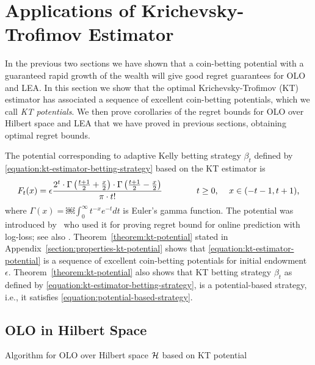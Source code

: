 \section{Applications of Krichevsky-Trofimov Estimator}
\label{section:kt-estimator}

In the previous two sections we have shown that a coin-betting potential with a
guaranteed rapid growth of the wealth will give good regret guarantees for
\ac{OLO} and \ac{LEA}. In this section we show that the optimal
Krichevsky-Trofimov (KT) estimator has associated a sequence of excellent
coin-betting potentials, which we call \emph{KT potentials}. We then prove
corollaries of the regret bounds for \ac{OLO} over Hilbert space and \ac{LEA}
that we have proved in previous sections, obtaining optimal regret bounds.

The potential corresponding to adaptive Kelly betting strategy
$\beta_t$ defined by \eqref{equation:kt-estimator-betting-strategy}
based on the KT estimator is
\begin{equation}
\label{equation:kt-estimator-potential}
F_t(x) = \epsilon \frac{2^t \cdot \Gamma \left( \frac{t+1}{2} + \frac{x}{2} \right) \cdot \Gamma \left( \frac{t+1}{2} - \frac{x}{2} \right)}{\pi \cdot t!}
\qquad \qquad \text{$t \ge 0$, \quad $x \in \left(-t-1, t+1\right)$,}
\end{equation}
where $\Gamma(x) = ￼\int_0^\infty t^{-x} e^{-t} dt$ is Euler's gamma function.
The potential was introduced by~\citet{KrichevskyT81} who used it for proving
regret bound for online prediction with log-loss; see also \cite[Section
9.7]{Cesa-BianchiL06}.
Theorem~\ref{theorem:kt-potential} stated in
Appendix~\ref{section:properties-kt-potential} shows that
\eqref{equation:kt-estimator-potential} is a sequence of excellent coin-betting
potentials for initial endowment $\epsilon$. Theorem~\ref{theorem:kt-potential}
also shows that KT betting strategy $\beta_t$ as defined by
\eqref{equation:kt-estimator-betting-strategy}, is a potential-based strategy,
i.e., it satisfies \eqref{equation:potential-based-strategy}.

\subsection{OLO in Hilbert Space}

\begin{algorithm}[t]
\caption{Algorithm for OLO over Hilbert space $\mathcal{H}$ based on KT potential
\label{algorithm:kt-hilbert-space-olo}}
\begin{algorithmic}
{
\ENDFOR
}
\end{algorithmic}
\end{algorithm}

